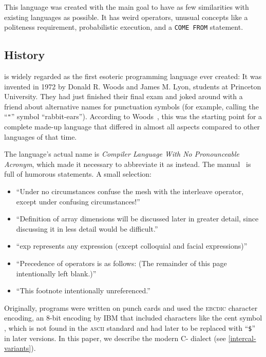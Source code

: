 This language was created with the main goal to have as few similarities with existing languages as possible. It has weird operators, unusual concepts like a politeness requirement, probabilistic execution, and a \texttt{COME FROM} statement.

\subsection{History}

\ic{} is widely regarded as the first esoteric programming language ever created: It was invented in 1972 by Donald R. Woods and James M. Lyon, students at Princeton University. They had just finished their final exam and joked around with a friend about alternative names for punctuation symbols (for example, calling the “\texttt{"}” symbol “rabbit-ears”). According to Woods~\cite{hamilton2008az}, this was the starting point for a complete made-up language that differed in almost all aspects compared to other languages of that time.

The language's actual name is \emph{Compiler Language With No Pronounceable Acronym}, which made it necessary to abbreviate it as \emph{\ic{}} instead. The manual~\cite{woods1973intercal} is full of humorous statements. A small selection:

\begin{itemize}
    \item “Under no circumstances confuse the mesh with the interleave operator, except under confusing circumstances!”
    \item “Definition of array dimensions will be discussed later in greater detail, since discussing it in less detail would be difficult.”
    \item “exp represents any expression (except colloquial and facial expressions)”
    \item “Precedence of operators is as follows: (The remainder of this page intentionally left blank.)”
    \item “This footnote intentionally unreferenced.”
\end{itemize}

Originally, \ic{} programs were written on punch cards and used the \textsc{ebcdic} character encoding, an 8-bit encoding by IBM that included characters like the cent symbol \texttt{\textcent}, which is not found in the \textsc{ascii} standard and had later to be replaced with “\texttt{\$}” in later versions. In this paper, we describe the modern C-\ic{} dialect (see \cref{intercal-variants}).

